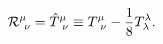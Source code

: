 \begin{equation}\label{new_einstein}
{\cal R}^{\mu}_{\ \nu} = {\hat{T}}^{\mu}_{\ \nu} \equiv T^{\mu}_{\
\nu} - {\frac{1}{8}} T^\lambda_\lambda .
\end{equation}

